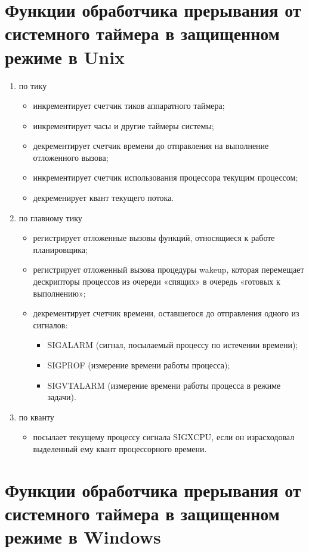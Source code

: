 \section{Функции обработчика прерывания от системного таймера в защищенном режиме в Unix}

\begin{enumerate}
	\item по тику
	\begin{itemize}
		\item инкрементирует счетчик тиков аппаратного таймера;
		\item инкрементирует часы и другие таймеры системы;
		\item декрементирует счетчик времени до отправления на выполнение отложенного вызова;
		\item инкрементирует счетчик использования процессора текущим процессом;
		\item декременирует квант текущего потока.
	\end{itemize}
	\item по главному тику
	\begin{itemize}
		\item регистрирует отложенные вызовы функций, относящиеся к работе планировщика;
		\item регистрирует отложенный вызова процедуры wakeup, которая
		перемещает дескрипторы процессов из очереди «спящих» в
		очередь «готовых к выполнению»;
		\item декрементирует счетчик времени, оставшегося до отправления одного из
		сигналов: 
		\begin{itemize}
			\item SIGALARM (сигнал, посылаемый процессу по истечении времени);
			\item SIGPROF (измерение времени работы процесса);
			\item SIGVTALARM (измерение времени работы процесса в режиме задачи).
		\end{itemize}
	\end{itemize}
	\item по кванту
	\begin{itemize}
		\item посылает текущему процессу сигнала SIGXCPU, если он
		израсходовал выделенный ему квант процессорного времени.
	\end{itemize}
\end{enumerate}

\section{Функции обработчика прерывания от системного таймера в защищенном режиме в Windows}

